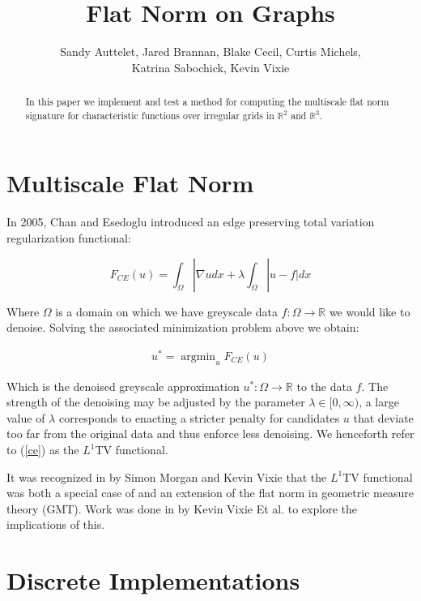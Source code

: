 \documentclass[12pt]{article}
\title{Flat Norm on Graphs}
\author{Sandy Auttelet, Jared Brannan, Blake Cecil, Curtis Michels,\\
 Katrina Sabochick, Kevin Vixie }
\DeclareMathOperator*{\argmin}{argmin}
\begin{document}
\maketitle

\begin{abstract}
In this paper we implement and test a method for computing the multiscale flat norm signature for characteristic functions over irregular grids in $\mathbb{R}^2$ and $\mathbb{R}^3$.
\end{abstract}

\tableofcontents

\section{Multiscale Flat Norm}

In 2005, Chan and Esedoglu introduced an edge preserving total variation regularization functional:

\begin{equation} \label{ce}
F_{CE}(u) = \int_\Omega |\nabla u dx + \lambda \int_{\Omega} |u-f|dx
\end{equation}

Where $\Omega$ is a domain on which we have greyscale data $f:\Omega \to \mathbb{R}$ we would like to denoise. Solving the associated minimization problem above we obtain:

\begin{align*}
u^* = \argmin_u F_{CE}(u)
\end{align*}

Which is the denoised greyscale approximation $u^*:\Omega \to \mathbb{R}$ to the data $f$. The strength of the denoising may be adjusted by the parameter $\lambda \in [0,\infty)$, a large value of $\lambda$ corresponds to enacting a stricter penalty for candidates $u$ that deviate too far from the original data and thus enforce less denoising. We henceforth refer to (\ref{ce}) as the $L^1$TV functional.

It was recognized in \cite{Morgan_2007} by Simon Morgan and Kevin Vixie that the $L^1$TV functional was both a special case of and an extension of the flat norm in geometric measure theory (GMT). Work was done in \cite{shapes} by Kevin Vixie Et al. to explore the implications of this.


\section{Discrete Implementations}
\end{document}

